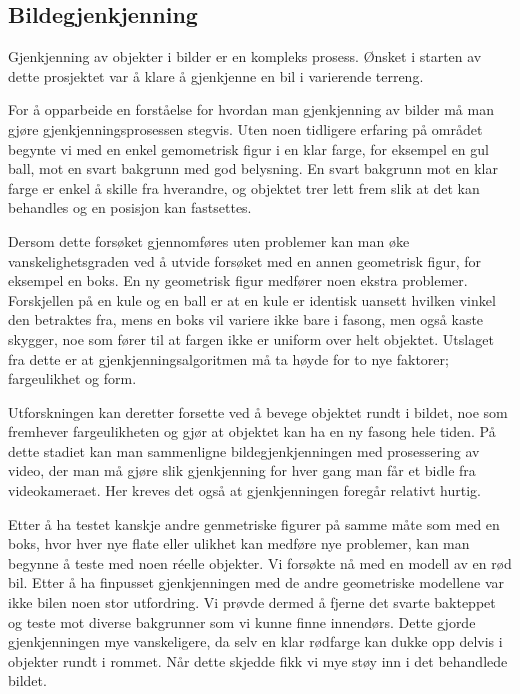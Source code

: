 \subsection{Bildegjenkjenning}

Gjenkjenning av objekter i bilder er en kompleks prosess. Ønsket i starten av dette prosjektet var å klare å gjenkjenne en bil i varierende terreng. 

For å opparbeide en forståelse for hvordan man gjenkjenning av bilder må man gjøre gjenkjenningsprosessen stegvis. Uten noen tidligere erfaring på området begynte vi med en enkel gemometrisk figur i en klar farge, for eksempel en gul ball, mot en svart bakgrunn med god belysning. En svart bakgrunn mot en klar farge er enkel å skille fra hverandre, og objektet trer lett frem slik at det kan behandles og en posisjon kan fastsettes. 

Dersom dette forsøket gjennomføres uten problemer kan man øke vanskelighetsgraden ved å utvide forsøket med en annen geometrisk figur, for eksempel en boks. En ny geometrisk figur medfører noen ekstra problemer. Forskjellen på en kule og en ball er at en kule er identisk uansett hvilken vinkel den betraktes fra, mens en boks vil variere ikke bare i fasong, men også kaste skygger, noe som fører til at fargen ikke er uniform over helt objektet. Utslaget fra dette er at gjenkjenningsalgoritmen må ta høyde for to nye faktorer; fargeulikhet og form.

Utforskningen kan deretter forsette ved å bevege objektet rundt i bildet, noe som fremhever fargeulikheten og gjør at objektet kan ha en ny fasong hele tiden. På dette stadiet kan man sammenligne bildegjenkjenningen med prosessering av video, der man må gjøre slik gjenkjenning for hver gang man får et bidle fra videokameraet. Her kreves det også at gjenkjenningen foregår relativt hurtig. 

Etter å ha testet kanskje andre genmetriske figurer på samme måte som med en boks, hvor hver nye flate eller ulikhet kan medføre nye problemer, kan man begynne å teste med noen réelle objekter. Vi forsøkte nå med en modell av en rød bil. Etter å ha finpusset gjenkjenningen med de andre geometriske modellene var ikke bilen noen stor utfordring. Vi prøvde dermed å fjerne det svarte bakteppet og teste mot diverse bakgrunner som vi kunne finne innendørs. Dette gjorde gjenkjenningen mye vanskeligere, da selv en klar rødfarge kan dukke opp delvis i objekter rundt i rommet. Når dette skjedde fikk vi mye støy inn i det behandlede bildet.

